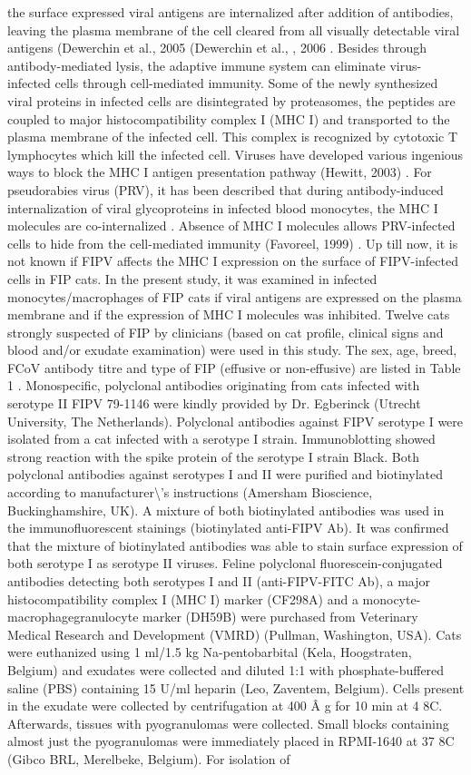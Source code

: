 \documentclass[11pt]{article}
\begin{document}
\begin{description}
the surface expressed viral antigens are internalized after addition of antibodies, leaving the plasma membrane of the cell cleared from all visually detectable viral antigens (Dewerchin et al., 2005 (Dewerchin et al., , 2006 . Besides through antibody-mediated lysis, the adaptive immune system can eliminate virus-infected cells through cell-mediated immunity. Some of the newly synthesized viral proteins in infected cells are disintegrated by proteasomes, the peptides are coupled to major histocompatibility complex I (MHC I) and transported to the plasma membrane of the infected cell. This complex is recognized by cytotoxic T lymphocytes which kill the infected cell. Viruses have developed various ingenious ways to block the MHC I antigen presentation pathway (Hewitt, 2003) . For pseudorabies virus (PRV), it has been described that during antibody-induced internalization of viral glycoproteins in infected blood monocytes, the MHC I molecules are co-internalized . Absence of MHC I molecules allows PRV-infected cells to hide from the cell-mediated immunity (Favoreel, 1999) . Up till now, it is not known if FIPV affects the MHC I expression on the surface of FIPV-infected cells in FIP cats. In the present study, it was examined in infected monocytes/macrophages of FIP cats if viral antigens are expressed on the plasma membrane and if the expression of MHC I molecules was inhibited. Twelve cats strongly suspected of FIP by clinicians (based on cat profile, clinical signs and blood and/or exudate examination) were used in this study. The sex, age, breed, FCoV antibody titre and type of FIP (effusive or non-effusive) are listed in Table 1 .  Monospecific, polyclonal antibodies originating from cats infected with serotype II FIPV 79-1146 were kindly provided by Dr. Egberinck (Utrecht University, The Netherlands). Polyclonal antibodies against FIPV serotype I were isolated from a cat infected with a serotype I strain. Immunoblotting showed strong reaction with the spike protein of the serotype I strain Black. Both polyclonal antibodies against serotypes I and II were purified and biotinylated according to manufacturer\textbackslash{}'s instructions (Amersham Bioscience, Buckinghamshire, UK). A mixture of both biotinylated antibodies was used in the immunofluorescent stainings (biotinylated anti-FIPV Ab). It was confirmed that the mixture of biotinylated antibodies was able to stain surface expression of both serotype I as serotype II viruses. Feline polyclonal fluorescein-conjugated antibodies detecting both serotypes I and II (anti-FIPV-FITC Ab), a major histocompatibility complex I (MHC I) marker (CF298A) and a monocyte-macrophagegranulocyte marker (DH59B) were purchased from Veterinary Medical Research and Development (VMRD) (Pullman, Washington, USA). Cats were euthanized using 1 ml/1.5 kg Na-pentobarbital (Kela, Hoogstraten, Belgium) and exudates were collected and diluted 1:1 with phosphate-buffered saline (PBS) containing 15 U/ml heparin (Leo, Zaventem, Belgium). Cells present in the exudate were collected by centrifugation at 400 Â g for 10 min at 4 8C. Afterwards, tissues with pyogranulomas were collected. Small blocks containing almost just the pyogranulomas were immediately placed in RPMI-1640 at 37 8C (Gibco BRL, Merelbeke, Belgium). For isolation of 
\end{description}
\end{document}
